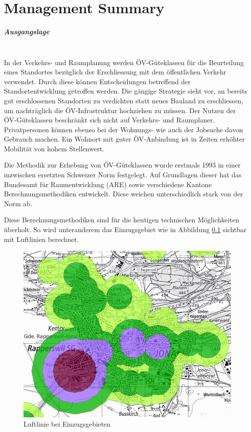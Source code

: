 
\chapter*{Management Summary}

\paragraph{Ausgangslage}~\\
In der Verkehrs- und Raumplanung werden ÖV-Güteklassen für die Beurteilung eines Standortes bezüglich der Erschliessung mit dem öffentlichen Verkehr verwendet.
Durch diese können Entscheidungen betreffend der Standortentwicklung getroffen werden.
Die gängige Strategie sieht vor, an bereits gut erschlossenen Standorten zu verdichten statt neues Bauland zu erschliessen, um nachträglich die ÖV-Infrastruktur hochziehen zu müssen.
Der Nutzen der ÖV-Güteklassen beschränkt sich nicht auf Verkehrs- und Raumplaner.
Privatpersonen können ebenso bei der Wohnungs- wie auch der Jobsuche davon Gebrauch machen.
Ein Wohnort mit guter ÖV-Anbindung ist in Zeiten erhöhter Mobilität von hohem Stellenwert.

Die Methodik zur Erhebung von ÖV-Güteklassen wurde erstmals 1993 in einer inzwischen ersetzten Schweizer Norm festgelegt.
Auf Grundlagen dieser hat das Bundesamt für Raumentwicklung (ARE) sowie verschiedene Kantone Berechnungsmethodiken entwickelt.
Diese weichen unterschiedlich stark von der Norm ab.

Diese Berechnungsmethodiken sind für die heutigen technischen Möglichkeiten überholt.
So wird unteranderem das Einzugsgebiet wie in Abbildung \ref{fig:air_line_ARE} sichtbar mit Luftlinien berechnet. 

\begin{figure}[ht]
    \centering
    \includegraphics[width=0.50\linewidth]{start/img/air_line_ARE.png}
    \caption[Luftlinie bei Einzugsgebieten]{Luftlinie bei Einzugsgebieten~\cite{berechnung_are}}
    \label{fig:air_line_ARE}
\end{figure}

